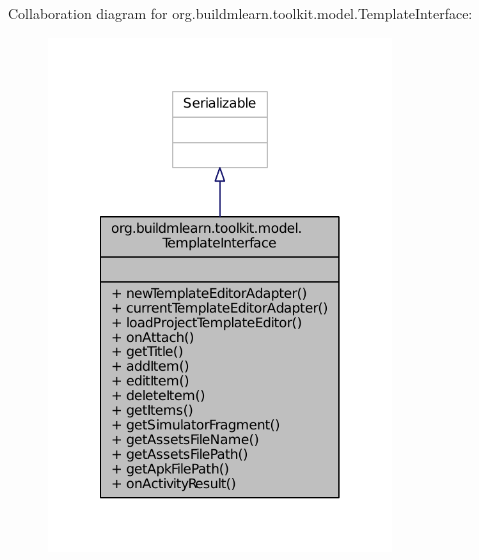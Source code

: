 Collaboration diagram for org.\-buildmlearn.\-toolkit.\-model.\-Template\-Interface\-:
\nopagebreak
\begin{figure}[H]
\begin{center}
\leavevmode
\includegraphics[width=258pt]{dc/d5d/interfaceorg_1_1buildmlearn_1_1toolkit_1_1model_1_1TemplateInterface__coll__graph}
\end{center}
\end{figure}
